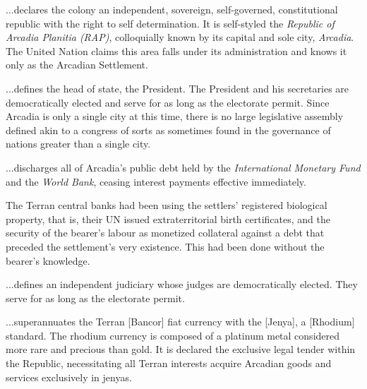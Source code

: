 

\startarticle
\item %

...declares the colony an independent, sovereign, self-governed, constitutional republic with the right to self determination. It is self-styled the {\it Republic of Arcadia Planitia (RAP)}, colloquially known by its capital and sole city, {\it Arcadia}. The United Nation claims this area falls under its administration and knows it only as the Arcadian Settlement.

\item %

...defines the head of state, the President. The President and his secretaries are democratically elected and serve for as long as the electorate permit. Since Arcadia is only a single city at this time, there is no large legislative assembly defined akin to a congress of sorts as sometimes found in the governance of nations greater than a single city.

\item %

...discharges all of Arcadia's public debt held by the {\it International Monetary Fund} and the {\it World Bank}, ceasing interest payments effective immediately. 

The Terran central banks had been using the settlers' registered biological property, that is, their UN issued extraterritorial birth certificates, and the security of the bearer's labour as monetized collateral against a debt that preceded the settlement's very existence. This had been done without the bearer's knowledge.

\item %

...defines an independent judiciary whose judges are democratically elected. They serve for as long as the electorate permit.
\stoparticle

\startarticle[start=7]
\item %

...superannuates the Terran [Bancor] fiat currency with the [Jenya], a [Rhodium] standard. The rhodium currency is composed of a platinum metal considered more rare and precious than gold. It is declared the exclusive legal tender within the Republic, necessitating all Terran interests acquire Arcadian goods and services exclusively in jenyas.


